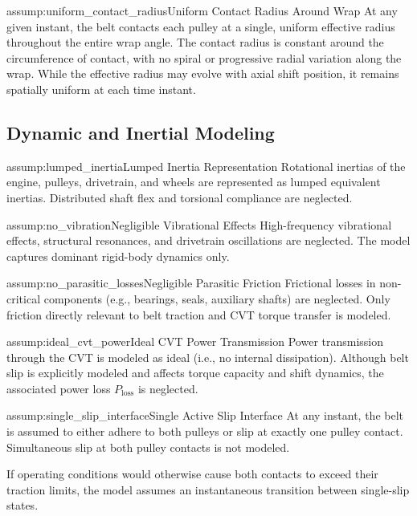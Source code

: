 \documentclass[11pt]{article}
\numberwithin{equation}{section}
\newcounter{assump}
\begin{document}
\begin{assumptionblock}{assump:uniform_contact_radius}{Uniform Contact Radius Around Wrap}
At any given instant, the belt contacts each pulley at a single,
uniform effective radius throughout the entire wrap angle.
The contact radius is constant around the circumference of contact,
with no spiral or progressive radial variation along the wrap.
While the effective radius may evolve with axial shift position,
it remains spatially uniform at each time instant.
\end{assumptionblock}

\subsection{Dynamic and Inertial Modeling}

\begin{assumptionblock}{assump:lumped_inertia}{Lumped Inertia Representation}
Rotational inertias of the engine, pulleys, drivetrain,
and wheels are represented as lumped equivalent inertias.
Distributed shaft flex and torsional compliance are neglected.
\end{assumptionblock}

\begin{assumptionblock}{assump:no_vibration}{Negligible Vibrational Effects}
High-frequency vibrational effects, structural resonances,
and drivetrain oscillations are neglected.
The model captures dominant rigid-body dynamics only.
\end{assumptionblock}

\begin{assumptionblock}{assump:no_parasitic_losses}{Negligible Parasitic Friction}
Frictional losses in non-critical components
(e.g., bearings, seals, auxiliary shafts)
are neglected.
Only friction directly relevant to belt traction
and CVT torque transfer is modeled.
\end{assumptionblock}

\begin{assumptionblock}{assump:ideal_cvt_power}{Ideal CVT Power Transmission}
Power transmission through the CVT is modeled as ideal
(i.e., no internal dissipation).
Although belt slip is explicitly modeled and affects
torque capacity and shift dynamics,
the associated power loss $P_{\text{loss}}$ is neglected.
\end{assumptionblock}

\begin{assumptionblock}{assump:single_slip_interface}{Single Active Slip Interface}
At any instant, the belt is assumed to either adhere to both pulleys
or slip at exactly one pulley contact.
Simultaneous slip at both pulley contacts is not modeled.

If operating conditions would otherwise cause both contacts to exceed
their traction limits, the model assumes an instantaneous transition
between single-slip states.
\end{assumptionblock}
\end{document}

